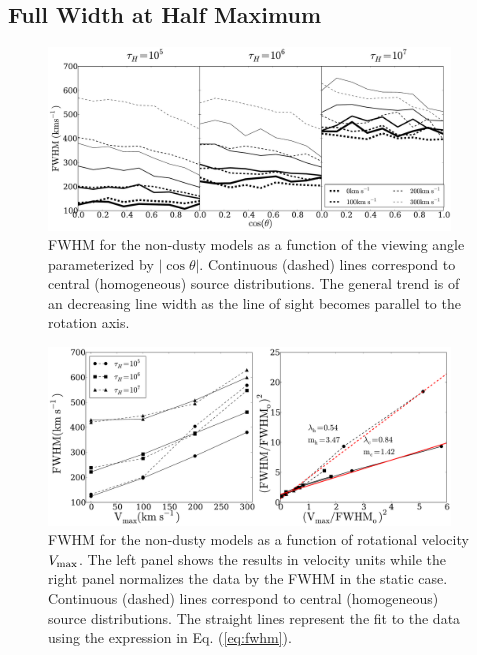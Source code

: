 \documentclass{emulateapj}
\begin{document}
\subsection{Full Width at Half Maximum}
\label{sec:widthpeak}


\begin{figure}
\begin{center}
  \includegraphics[width=0.95\textwidth]{f6.pdf}
\end{center}
  \caption{FWHM for the non-dusty models as a function of the viewing
  angle parameterized by $|\cos\theta|$. Continuous (dashed) lines  correspond
  to central (homogeneous) source distributions. The general trend is
  of an decreasing line width as the line of sight becomes parallel to the
  rotation axis.
  \label{fig:widthvsmu}} 
\end{figure}

\begin{figure}
\begin{center}
  \includegraphics[width=0.95\textwidth]{f7.pdf}
\end{center}
\caption{FWHM for the non-dusty models as a function of
  rotational velocity $V_{\rm max}$. The left panel shows the
  results in velocity units while the right panel normalizes
  the data by the FWHM in the static case. 
  Continuous (dashed) lines  correspond to central (homogeneous)
  source distributions. The straight lines represent the fit to
  the data using the expression in Eq. (\ref{eq:fwhm}).
  \label{fig:widthsvsvelocity}}
\end{figure}
\end{document}
